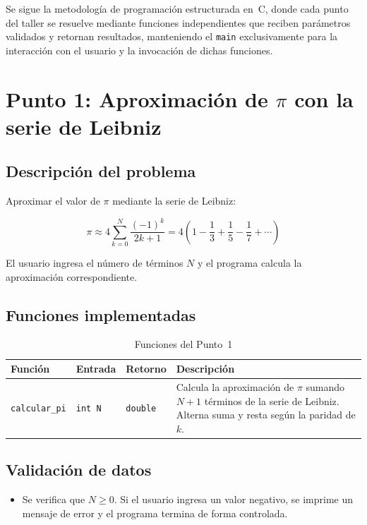 \documentclass[12pt, letterpaper]{article}
\begin{document}
Se sigue la metodología de programación estructurada en~C, donde cada punto del
taller se resuelve mediante funciones independientes que reciben parámetros
validados y retornan resultados, manteniendo el \texttt{main} exclusivamente
para la interacción con el usuario y la invocación de dichas funciones.

\section{Punto 1: Aproximación de $\pi$ con la serie de Leibniz}

\subsection{Descripción del problema}

Aproximar el valor de $\pi$ mediante la serie de Leibniz:

\[
    \pi \approx 4 \sum_{k=0}^{N} \frac{(-1)^k}{2k+1}
    = 4 \left(1 - \frac{1}{3} + \frac{1}{5} - \frac{1}{7} + \cdots \right)
\]

El usuario ingresa el número de términos $N$ y el programa calcula la
aproximación correspondiente.

\subsection{Funciones implementadas}

\begin{table}[H]
\centering
\begin{tabular}{|l|l|l|p{6cm}|}
\hline
\textbf{Función} & \textbf{Entrada} & \textbf{Retorno} & \textbf{Descripción} \\
\hline
\texttt{calcular\_pi} & \texttt{int N} & \texttt{double} &
Calcula la aproximación de $\pi$ sumando $N+1$ términos de la serie de
Leibniz. Alterna suma y resta según la paridad de $k$. \\
\hline
\end{tabular}
\caption{Funciones del Punto~1}
\end{table}

\subsection{Validación de datos}

\begin{itemize}
    \item Se verifica que $N \geq 0$. Si el usuario ingresa un valor negativo,
          se imprime un mensaje de error y el programa termina de forma
          controlada.
\end{itemize}
\end{document}

